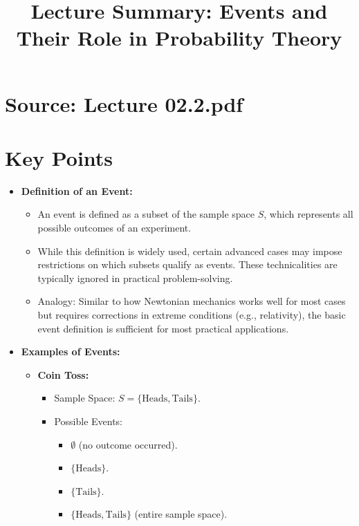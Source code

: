 \documentclass{article}
\title{Lecture Summary: Events and Their Role in Probability Theory}
\author{}
\date{}
\begin{document}
\maketitle

\section*{Source: Lecture 02.2.pdf}

\section*{Key Points}

\begin{itemize}
  \item \textbf{Definition of an Event:}
    \begin{itemize}
      \item An event is defined as a subset of the sample space $S$, which represents all possible outcomes of an experiment.
      \item While this definition is widely used, certain advanced cases may impose restrictions on which subsets qualify as events. These technicalities are typically ignored in practical problem-solving.
      \item Analogy: Similar to how Newtonian mechanics works well for most cases but requires corrections in extreme conditions (e.g., relativity), the basic event definition is sufficient for most practical applications.
    \end{itemize}

  \item \textbf{Examples of Events:}
    \begin{itemize}
      \item \textbf{Coin Toss:}
        \begin{itemize}
          \item Sample Space: $S = \{\text{Heads}, \text{Tails}\}$.
          \item Possible Events:
            \begin{itemize}
              \item $\emptyset$ (no outcome occurred).
              \item $\{\text{Heads}\}$.
              \item $\{\text{Tails}\}$.
              \item $\{\text{Heads}, \text{Tails}\}$ (entire sample space).
            \end{itemize}
        \end{itemize}


\end{itemize}
\end{itemize}
\end{document}

